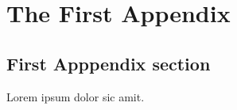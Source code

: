 \documentclass[draft,12pt]{ukydissertation}
\begin{document}
\backmatter

\chapter{The First Appendix}
\label{cha:first-appendix}

\section{First Apppendix section}
\label{sec:first-appp-sect}
Lorem ipsum dolor sic amit.

\clearpage
{}
 
 
\end{document}
